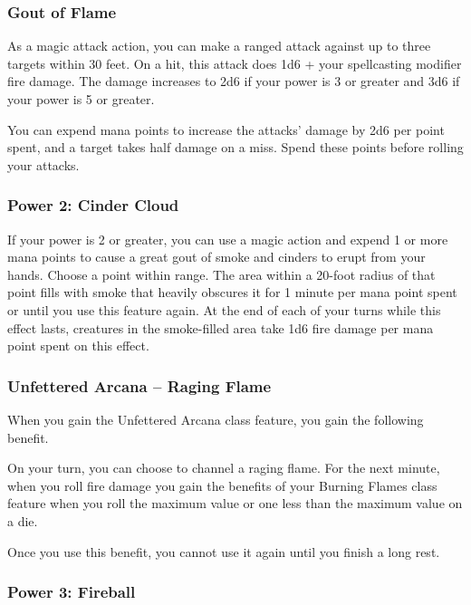 \documentclass[12pt,letterpaper,twocolumn,openany,nodeprecatedcode,bg=none]{dndbook}
\begin{document}
\subsubsection{Gout of Flame}\label{gout-of-flame}

As a magic attack action, you can make a ranged attack against up to
three targets within 30 feet. On a hit, this attack does 1d6 + your
spellcasting modifier fire damage. The damage increases to 2d6 if your
power is 3 or greater and 3d6 if your power is 5 or greater.

You can expend mana points to increase the attacks' damage by 2d6 per
point spent, and a target takes half damage on a miss. Spend these
points before rolling your attacks.

\subsubsection{Power 2: Cinder Cloud}\label{power-2-cinder-cloud}

If your power is 2 or greater, you can use a magic action and expend 1
or more mana points to cause a great gout of smoke and cinders to erupt
from your hands. Choose a point within range. The area within a 20-foot
radius of that point fills with smoke that heavily obscures it for 1
minute per mana point spent or until you use this feature again. At the
end of each of your turns while this effect lasts, creatures in the
smoke-filled area take 1d6 fire damage per mana point spent on this
effect.

\subsubsection{Unfettered Arcana -- Raging
Flame}\label{unfettered-arcana-raging-flame}

When you gain the Unfettered Arcana class feature, you gain the
following benefit.

On your turn, you can choose to channel a raging flame. For the next
minute, when you roll fire damage you gain the benefits of your Burning
Flames class feature when you roll the maximum value or one less than
the maximum value on a die.

Once you use this benefit, you cannot use it again until you finish a
long rest.

\subsubsection{Power 3: Fireball}\label{power-3-fireball}
\end{document}
